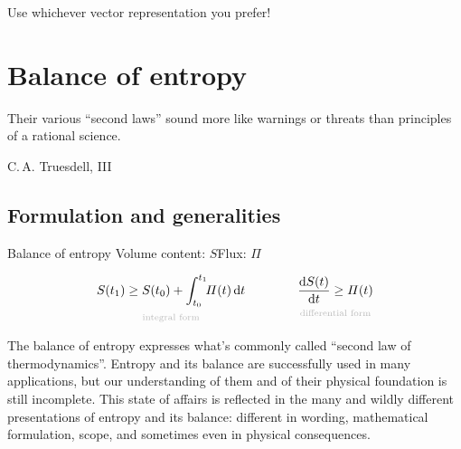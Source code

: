 \documentclass[a4paper,12pt,%
onecolumn,oneside,%
british%
]{memoir}
\newcommand{\mynotew}[1]{{\footnotesize\color{midgrey}\faIcon{tools}\ #1}}
\newcommand*{\di}{\mathrm{d}}%
\renewcommand*{\|}[1][]{\nonscript\:#1\vert\nonscript\:\mathopen{}}
\newcommand*{\yti}{t_{0}}
\newcommand*{\ytf}{t_{1}}
\newcommand*{\yS}{S}
\newcommand*{\yB}{\varPi}
\begin{document}
Use whichever vector representation you prefer! %

\printpagenotes*
\clearpage
\chapter{Balance of entropy}
\label{cha:bal_entropy}


\epigraph{Their various ``second laws'' sound more like warnings or threats than principles of a rational science.}{C.\,A. Truesdell, III \cites*{truesdell1969_r1984}}

\section{Formulation and generalities}
\label{sec:bal_entropy_formulation}


\begin{definition}{Balance of entropy}
  Volume content: $\yS$\qquad Flux: $\yB$


  \begin{equation}
    \label{eq:bal_entropy}
      \underbracket[0pt]{\yS(\ytf) \ge \yS(\yti) + \int_{\yti}^{\ytf}\!\!\yB(t)\,\di t}_{\mathclap{\text{\color{grey}integral form}}}
      \qquad%
      \qquad
      \underbracket[0pt]{\frac{\di\yS(t)}{\di t} \ge \yB(t)}_{\mathclap{\text{\color{grey}differential form}}}
  \end{equation}
\end{definition}


The balance of entropy expresses what's commonly called \enquote{second law of thermodynamics}. Entropy and its balance are successfully used in many applications, but our understanding of them and of their physical foundation is still incomplete. This state of affairs is reflected in the many and wildly different presentations of entropy and its balance: different in wording, mathematical formulation, scope, and sometimes even in physical consequences.
\end{document}
